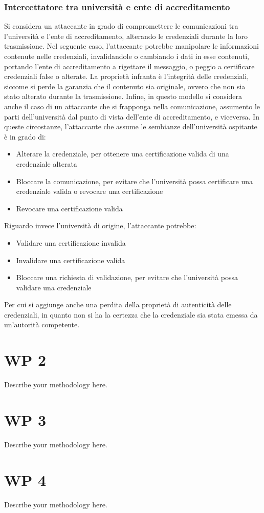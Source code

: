 \documentclass[a4paper,12pt]{article}
\begin{document}
\subsubsection{Intercettatore tra università e ente di accreditamento} Si considera un attaccante in grado di compromettere le comunicazioni tra l'università e l'ente di accreditamento, alterando le credenziali durante la loro trasmissione. Nel seguente caso, l'attaccante potrebbe manipolare le informazioni contenute nelle credenziali, invalidandole o cambiando i dati in esse contenuti, portando l'ente di accreditamento a rigettare il messaggio, o peggio a certificare credenziali false o alterate.
\newline La proprietà infranta è l'integrità delle credenziali, siccome si perde la garanzia che il contenuto sia originale, ovvero che non sia stato alterato durante la trasmissione.
\newline Infine, in questo modello si considera anche il caso di un attaccante che si frapponga nella comunicazione, assumento le parti dell'università dal punto di vista dell'ente di accreditamento, e viceversa. In queste circostanze, l'attaccante che assume le sembianze dell'università ospitante è in grado di:
\begin{itemize}
    \item Alterare la credenziale, per ottenere una certificazione valida di una credenziale alterata
    \item Bloccare la comunicazione, per evitare che l'università possa certificare una credenziale valida o revocare una certificazione
    \item Revocare una certificazione valida
\end{itemize}
Riguardo invece l'università di origine, l'attaccante potrebbe:
\begin{itemize}
    \item Validare una certificazione invalida
    \item Invalidare una certificazione valida
    \item Bloccare una richiesta di validazione, per evitare che l'università possa validare una credenziale
\end{itemize}
Per cui si aggiunge anche una perdita della proprietà di autenticità delle credenziali, in quanto non si ha la certezza che la credenziale sia stata emessa da un'autorità competente. 
\newpage
\section{WP 2}
Describe your methodology here.
\newpage
\section{WP 3}
Describe your methodology here.
\newpage
\section{WP 4}
Describe your methodology here.
\end{document}
